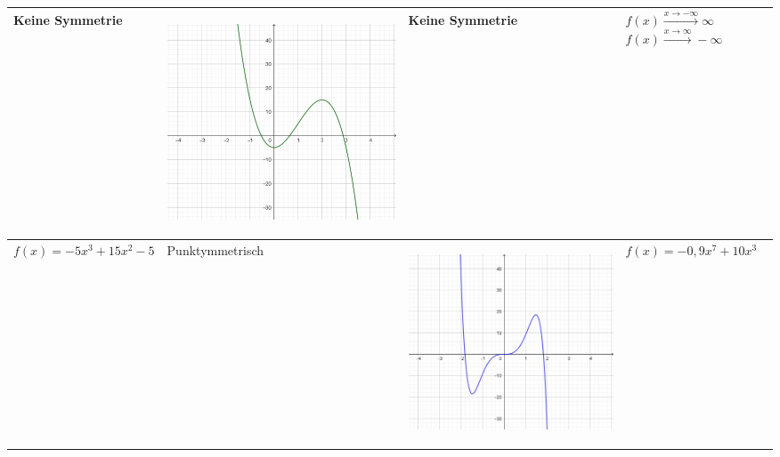 \documentclass[oneside,openany,headings=optiontotoc,11pt,numbers=noenddot]{scrreprt}
\begin{document}
\begin{table}
\begin{tabular}{|M{4.35cm}|M{4.35cm}||M{4.35cm}|M{4.35cm}|}
			\hline
			Keine Symmetrie
			& \begin{center}\includegraphics[scale=0.15]{04-GanzrationaleFunktionen/m1.jpg}\end{center} & Keine Symmetrie & \\
			\hline
			\(f(x)=-5x^3+15x^2-5\)  & Punktymmetrisch & \begin{center}\includegraphics[scale=0.15]{04-GanzrationaleFunktionen/n1.jpg}\end{center} & \(f(x)=-0,9x^7+10x^3\) \\

\end{tabular}
\end{table}
\end{document}
